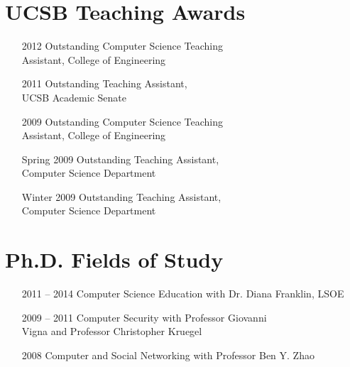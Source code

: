 \documentclass[10pt,letterpaper,oneside,twocolumn]{article}
\begin{document}
\section{UCSB Teaching Awards}
\begin{itemize}
  \item [2012] Outstanding Computer Science Teaching\\ Assistant, College of
    Engineering
  \item [2011] Outstanding Teaching Assistant,\\ UCSB Academic Senate
  \item [2009] Outstanding Computer Science Teaching\\ Assistant, College of
    Engineering
  \item [Spring 2009] Outstanding Teaching Assistant,\\ Computer Science
    Department
  \item [Winter 2009] Outstanding Teaching Assistant,\\ Computer Science
    Department
\end{itemize}


\section{Ph.D. Fields of Study}
\begin{itemize}
  \item [2011 -- 2014] Computer Science Education with Dr. Diana Franklin, LSOE
  \item [2009 -- 2011] Computer Security with Professor Giovanni\\ Vigna
    and Professor Christopher Kruegel
  \item [2008] Computer and Social Networking with Professor Ben Y. Zhao
\end{itemize}
\end{document}
